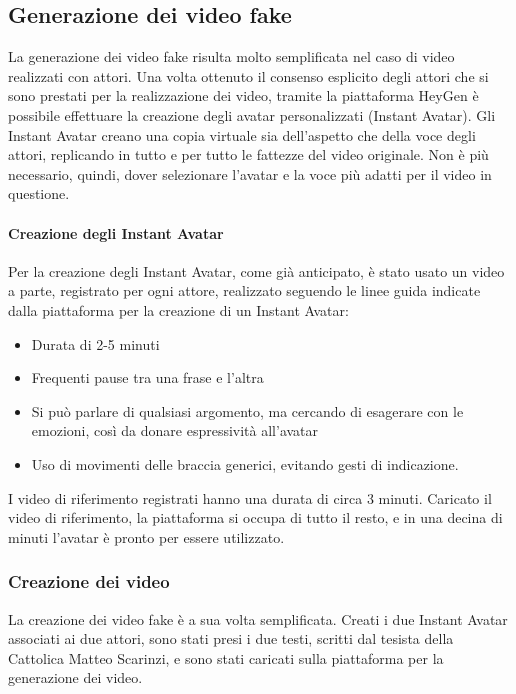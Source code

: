 \subsection{Generazione dei video fake}

La generazione dei video fake risulta molto semplificata nel caso di video realizzati con attori. Una volta ottenuto il consenso esplicito degli attori che si sono prestati per la realizzazione dei video, tramite la piattaforma HeyGen è possibile effettuare la creazione degli avatar personalizzati (Instant Avatar). Gli Instant Avatar creano una copia virtuale sia dell'aspetto che della voce degli attori, replicando in tutto e per tutto le fattezze del video originale. Non è più necessario, quindi, dover selezionare l'avatar e la voce più adatti per il video in questione.

\paragraph{Creazione degli Instant Avatar}

Per la creazione degli Instant Avatar, come già anticipato, è stato usato un video a parte, registrato per ogni attore, realizzato seguendo le linee guida indicate dalla piattaforma per la creazione di un Instant Avatar:
\begin{itemize}
    \item Durata di 2-5 minuti
    \item Frequenti pause tra una frase e l'altra
    \item Si può parlare di qualsiasi argomento, ma cercando di esagerare con le emozioni, così da donare espressività all'avatar
    \item Uso di movimenti delle braccia generici, evitando gesti di indicazione.
\end{itemize}

I video di riferimento registrati hanno una durata di circa 3 minuti. Caricato il video di riferimento, la piattaforma si occupa di tutto il resto, e in una decina di minuti l'avatar è pronto per essere utilizzato.

\subsubsection{Creazione dei video}

La creazione dei video fake è a sua volta semplificata. Creati i due Instant Avatar associati ai due attori, sono stati presi i due testi, scritti dal tesista della Cattolica Matteo Scarinzi, e sono stati caricati sulla piattaforma per la generazione dei video. 

